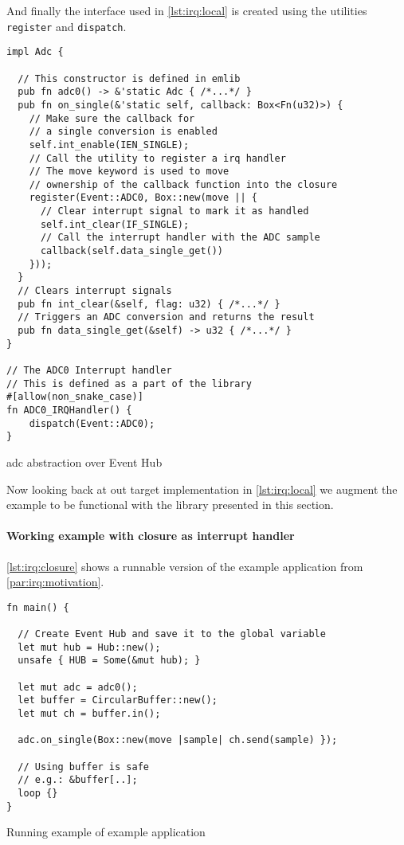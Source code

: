 And finally the interface used in \autoref{lst:irq:local} is created using the utilities \texttt{register} and \texttt{dispatch}.
\begin{listing}[H]
  \begin{verbatim}
impl Adc {

  // This constructor is defined in emlib
  pub fn adc0() -> &'static Adc { /*...*/ }
  pub fn on_single(&'static self, callback: Box<Fn(u32)>) {
    // Make sure the callback for
    // a single conversion is enabled
    self.int_enable(IEN_SINGLE);
    // Call the utility to register a irq handler
    // The move keyword is used to move
    // ownership of the callback function into the closure
    register(Event::ADC0, Box::new(move || {
      // Clear interrupt signal to mark it as handled
      self.int_clear(IF_SINGLE);
      // Call the interrupt handler with the ADC sample
      callback(self.data_single_get())
    }));
  }
  // Clears interrupt signals
  pub fn int_clear(&self, flag: u32) { /*...*/ }
  // Triggers an ADC conversion and returns the result
  pub fn data_single_get(&self) -> u32 { /*...*/ }
}

// The ADC0 Interrupt handler
// This is defined as a part of the library
#[allow(non_snake_case)]
fn ADC0_IRQHandler() {
    dispatch(Event::ADC0);
}
  \end{verbatim}
  \caption{\gls{adc} abstraction over Event Hub}
  \label{lst:adc-abstraction}
\end{listing}

Now looking back at out target implementation in \autoref{lst:irq:local} we augment the example to be functional with the library presented in this section.

\paragraph{Working example with closure as interrupt handler}

\autoref{lst:irq:closure} shows a runnable version of the example application from \autoref{par:irq:motivation}.

\begin{listing}[H]
  \begin{verbatim}
fn main() {

  // Create Event Hub and save it to the global variable
  let mut hub = Hub::new();
  unsafe { HUB = Some(&mut hub); }

  let mut adc = adc0();
  let buffer = CircularBuffer::new();
  let mut ch = buffer.in();

  adc.on_single(Box::new(move |sample| ch.send(sample) });

  // Using buffer is safe
  // e.g.: &buffer[..];
  loop {}
}
  \end{verbatim}
  \caption{Running example of example application}
  \label{lst:irq:closure}
\end{listing}

